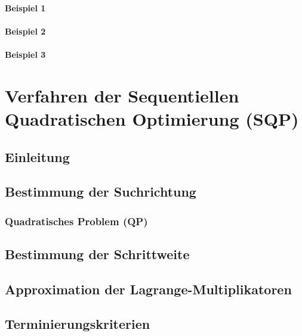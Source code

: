 		\paragraph{Beispiel 1} %

		\paragraph{Beispiel 2} %

		\paragraph{Beispiel 3} %

	\section{Verfahren der Sequentiellen Quadratischen Optimierung (SQP)} %

		\subsection{Einleitung} %

		\subsection{Bestimmung der Suchrichtung} %

			\subsubsection{Quadratisches Problem (QP)} %

		\subsection{Bestimmung der Schrittweite} %

		\subsection{Approximation der Lagrange-Multiplikatoren} %

		\subsection{Terminierungskriterien} %


